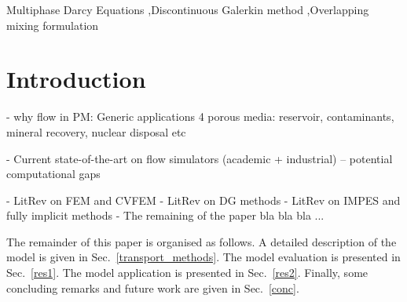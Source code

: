 \documentclass[preprint,authoryear,12pt]{elsarticle}
\begin{document}
\begin{frontmatter}
\begin{keyword}
Multiphase Darcy Equations \sep Discontinuous Galerkin method \sep Overlapping mixing formulation 


\end{keyword}

\end{frontmatter}

\tableofcontents
\section{Introduction}

- why flow in PM: Generic applications 4 porous media: reservoir, contaminants, mineral recovery, nuclear disposal etc 

- Current state-of-the-art on flow simulators (academic + industrial) -- potential computational gaps

- LitRev on FEM and CVFEM
- LitRev on DG methods
- LitRev on IMPES and fully implicit methods
- The remaining of the paper bla bla bla ... 






The remainder of this paper is organised as follows. A detailed
description of the model is given in Sec.~\ref{transport_methods}. The
model evaluation is presented in Sec.~\ref{res1}. The model
application is presented in Sec.~\ref{res2}. Finally, some concluding
remarks and future work are given in Sec.~\ref{conc}.
\end{document}
